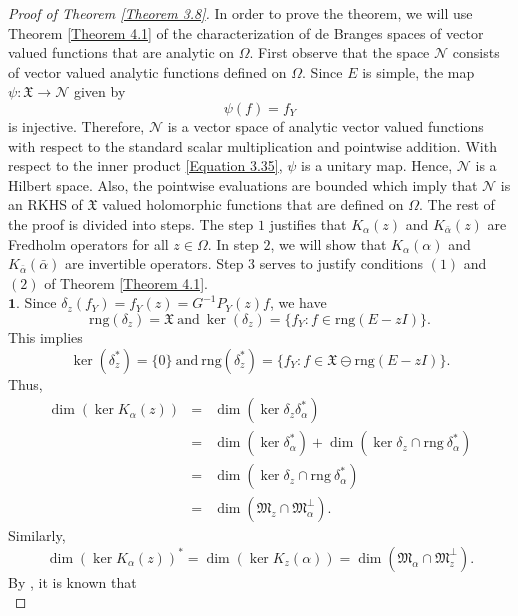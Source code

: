 \documentclass [12pt,reqno]{amsart}
\numberwithin{equation}{subsection}
\numberwithin{equation}{section}
\begin{document}
\begin{proof}[Proof of Theorem \ref{Theorem 3.8}]
In order to prove the theorem, we will use Theorem \ref{Theorem 4.1} of the characterization of de Branges spaces of vector valued functions that are analytic on $\Omega$. First observe that the space $\mathcal{N}$ consists of vector valued analytic functions defined on $\Omega$. Since $E$ is simple, the map $\psi : \mathfrak{X} \rightarrow \mathcal{N}$ given by $$\psi(f)=f_Y$$ is injective. Therefore, $\mathcal{N}$ is a vector space of analytic vector valued functions with respect to the standard scalar multiplication and pointwise addition. With respect to the inner product \eqref{Equation 3.35}, $\psi$ is a unitary map. Hence, $\mathcal{N}$ is a Hilbert space. Also, the pointwise evaluations are bounded which imply that $\mathcal{N}$ is an RKHS of $\mathfrak{X}$ valued holomorphic functions that are defined on $\Omega$. The rest of the proof is divided into steps. The step $1$ justifies that $K_{\alpha}(z)$ and $K_{\bar{\alpha}}(z)$ are Fredholm operators for all $z \in \Omega$. In step $2$, we will show that $K_{\alpha}(\alpha)$ and $K_{\bar{\alpha}}(\bar{\alpha})$ are invertible operators. Step $3$ serves to justify conditions $(1)$ and $(2)$ of Theorem \ref{Theorem 4.1}.
\\
$\textbf{1.}$ Since $\delta_z(f_Y)= f_Y(z)=G^{-1}P_Y(z)f$,
we have \begin{equation} \label{Equation 4.1}\mathrm{rng}(\delta_z)=\mathfrak{X}~ \mbox{and}~ \ker(\delta_z)=\{ f_Y : f \in \mathrm{rng}(E-zI) \}.
\end{equation} 
This implies \begin{equation} \label{Equation 4.2}\ker(\delta_z^*)=\{ 0 \}~ \mbox{and}~ \mathrm{rng}(\delta_z^*)=\{ f_Y : f \in \mathfrak{X} \ominus \mathrm{rng}(E-zI) \}.
\end{equation}
Thus, \begin{eqnarray*}\dim(\ker K_{\alpha}(z))
&=&\dim(\ker \delta_z \delta_{\alpha}^*)\\
&=& \dim(\ker \delta_{\alpha}^*)+\dim(\ker \delta_z \cap \mathrm{rng}~\delta_{\alpha}^*)\\
&=& \dim(\ker \delta_z \cap \mathrm{rng}~\delta_{\alpha}^*)\\
&=& \dim(\mathfrak{M}_z \cap \mathfrak{M}_{\alpha}^{\perp}).\end{eqnarray*}
Similarly, $$\dim(\ker K_{\alpha}(z))^*=\dim(\ker K_{z}(\alpha))=\dim(\mathfrak{M}_{\alpha} \cap \mathfrak{M}_{z}^{\perp}).$$
By \cite[Lemma $2.1$]{straus}, it is known that \begin{equation}\label{Equation 4.3}

\end{equation}
\end{proof}
\end{document}
